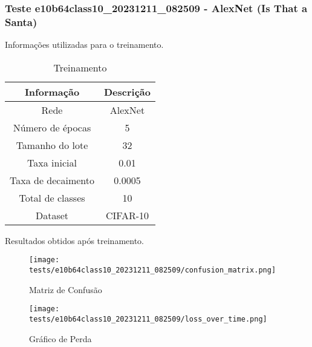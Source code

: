 \subsubsection{Teste e10b64class10_20231211_082509 - AlexNet (Is That a Santa)}

Informações utilizadas para o treinamento.

\begin{table}[ht]
   \centering
   \caption{Treinamento}
   \label{tab:modelos}
   \begin{tabular}{| c | c | }
      \hline 
      \textbf{Informação} & \textbf{Descrição} \\
      \hline \hline 
      Rede & AlexNet \\
      \hline
      Número de épocas & 5\\
      \hline
      Tamanho do lote & 32\\
      \hline
      Taxa inicial & 0.01 \\
      \hline
      Taxa de decaimento & 0.0005 \\
      \hline
      Total de classes & 10\\
      \hline
      Dataset & CIFAR-10\\
      \hline
   \end{tabular} 
\end{table}

Resultados obtidos após treinamento.


\begin{figure}[ht]
 \begin{center}
   \texttt{[image: tests/e10b64class10\_20231211\_082509/confusion\_matrix.png]}
  \caption{Matriz de Confusão}
  \label{fig:fig03}
 \end{center}
\end{figure}

\begin{figure}[ht]
 \begin{center}
   \texttt{[image: tests/e10b64class10\_20231211\_082509/loss\_over\_time.png]}
  \caption{Gráfico de Perda}
  \label{fig:fig04}
 \end{center}
\end{figure}
